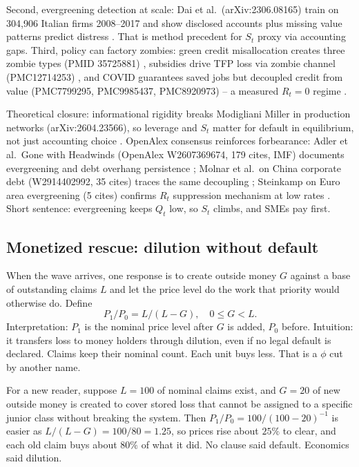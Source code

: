 \documentclass[11pt]{article}
\begin{document}
Second, evergreening detection at scale: Dai et al.\ (arXiv:2306.08165) train on 304,906 Italian firms 2008--2017 and show disclosed accounts plus missing value patterns predict distress \citep{dai2023zombie}. That is method precedent for $S_t$ proxy via accounting gaps. Third, policy can factory zombies: green credit misallocation creates three zombie types (PMID 35725881) \citep{pmid35725881}, subsidies drive TFP loss via zombie channel (PMC12714253) \citep{pmc12714253}, and COVID guarantees saved jobs but decoupled credit from value (PMC7799295, PMC9985437, PMC8920973) -- a measured $R_t=0$ regime \citep{covid7799295}.

Theoretical closure: informational rigidity breaks Modigliani Miller in production networks (arXiv:2604.23566), so leverage and $S_t$ matter for default in equilibrium, not just accounting choice \citep{rigidity2604}. OpenAlex consensus reinforces forbearance: Adler et al.\ Gone with Headwinds (OpenAlex W2607369674, 179 cites, IMF) documents evergreening and debt overhang persistence \citep{adler2017}; Molnar et al.\ on China corporate debt (W2914402992, 35 cites) traces the same decoupling \citep{molnar2019}; Steinkamp on Euro area evergreening (5 cites) confirms $R_t$ suppression mechanism at low rates \citep{steinkamp2021}. Short sentence: evergreening keeps $Q_t$ low, so $S_t$ climbs, and SMEs pay first.

\subsection{Monetized rescue: dilution without default}

When the wave arrives, one response is to create outside money $G$ against a base of outstanding claims $L$ and let the price level do the work that priority would otherwise do. Define
\begin{equation}
P_1/P_0 = L/(L-G),\quad 0 \le G < L.
\label{eq:P1P0}
\end{equation}
Interpretation: $P_1$ is the nominal price level after $G$ is added, $P_0$ before. Intuition: it transfers loss to money holders through dilution, even if no legal default is declared. Claims keep their nominal count. Each unit buys less. That is a $\phi$ cut by another name.

For a new reader, suppose $L=100$ of nominal claims exist, and $G=20$ of new outside money is created to cover stored loss that cannot be assigned to a specific junior class without breaking the system. Then $P_1/P_0 = 100/(100-20)^{-1}$ is easier as $L/(L-G)=100/80=1.25$, so prices rise about $25\%$ to clear, and each old claim buys about $80\%$ of what it did. No clause said default. Economics said dilution.
\end{document}

